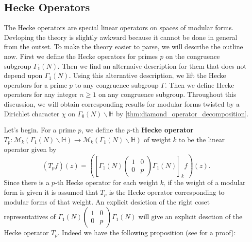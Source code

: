 \documentclass[12pt]{book}
\theoremstyle{definition}\newframedtheorem{method}{Method}
\newcommand{\mc}{\mathcal}
\renewcommand{\H}{\mathbb{H}}
\newcommand{\G}{\Gamma}
\newcommand{\<}{\langle}
\renewcommand{\>}{\rangle}
\begin{document}
    \subsection*{Hecke Operators}
      The Hecke operators are special linear operators on spaces of modular forms. Devloping the theory is slightly awkward because it cannot be done in general from the outset. To make the theory easier to parse, we will describe the outline now. First we define the Hecke operators for primes $p$ on the congruence subgroup $\G_{1}(N)$. Then we find an alternaive description for them that does not depend upon $\G_{1}(N)$. Using this alternative description, we lift the Hecke operators for a prime $p$ to any congruence subgroup $\G$. Then we define Hecke operators for any integer $n \ge 1$ on any congruence subgroup. Throughout this discussion, we will obtain corresponding results for modular forms twisted by a Dirichlet character $\chi$ on $\G_{0}(N)\backslash\H$ by \cref{thm:diamond_operator_decomposition}.

      Let's begin. For a prime $p$, we define the $p$-th \textbf{Hecke operator} $T_{p}:\mc{M}_{k}(\G_{1}(N)\backslash\H) \to \mc{M}_{k}(\G_{1}(N)\backslash\H)$ of weight $k$ to be the linear operator given by
      \[
        (T_{p}f)(z) = \left(\left[\G_{1}(N)\begin{pmatrix} 1 & 0 \\ 0 & p \end{pmatrix}\G_{1}(N)\right]_{k}f\right)(z).
      \]
      Since there is a $p$-th Hecke operator for each weight $k$, if the weight of a modular form is given it is assumed that $T_{p}$ is the Hecke operator corresponding to modular forms of that weight. An explicit desiction of the right coset representatives of $\G_{1}(N)\begin{pmatrix} 1 & 0 \\ 0 & p \end{pmatrix}\G_{1}(N)$ will give an explicit desction of the Hecke operator $T_{p}$. Indeed we have the following proposition (see \cite{diamond2005first} for a proof):
\end{document}
